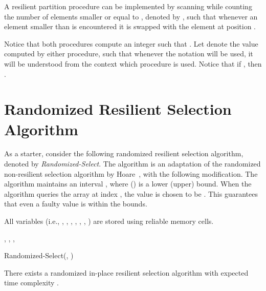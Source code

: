 \documentclass{llncs}
\begin{document}
\begin{pf}
A resilient partition procedure can be implemented by scanning  while counting the number of elements smaller or equal to , denoted by , such that whenever an element smaller than  is encountered it is swapped with the element at position .
\end{pf}

Notice that both procedures compute an integer  such that . Let  denote the value  computed by either procedure, such that whenever the notation  will be used, it will be understood from the context which procedure is used. Notice that if , then .

















\section{Randomized Resilient Selection Algorithm}
\label{sec:resilient_randomized_selection_algorithm}

As a starter, consider the following randomized resilient selection algorithm, denoted by \emph{Randomized-Select}. The algorithm is an adaptation of the randomized non-resilient selection algorithm by Hoare~\cite{hoare_selection}, with the following modification. The algorithm maintains an interval , where  () is a lower (upper) bound. When the algorithm queries the array  at index , the value  is chosen to be . This guarantees that even a faulty value is within the bounds.

All variables (i.e., , , , , , , ) are stored using reliable memory cells.

\vspace{15px}
\begin{algorithm}[H]

, , , \;

\caption{Randomized-Select(, )}
\end{algorithm}
\vspace{15px}

\begin{theorem}\label{theorem:random_select}
There exists a randomized in-place resilient selection algorithm with expected time complexity .
\end{theorem}
\end{document}
